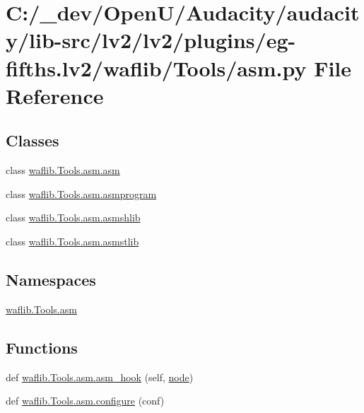 \hypertarget{lv2_2plugins_2eg-fifths_8lv2_2waflib_2_tools_2asm_8py}{}\section{C\+:/\+\_\+dev/\+Open\+U/\+Audacity/audacity/lib-\/src/lv2/lv2/plugins/eg-\/fifths.lv2/waflib/\+Tools/asm.py File Reference}
\label{lv2_2plugins_2eg-fifths_8lv2_2waflib_2_tools_2asm_8py}
\subsection*{Classes}
\begin{DoxyCompactItemize}
\item 
class \hyperlink{classwaflib_1_1_tools_1_1asm_1_1asm}{waflib.\+Tools.\+asm.\+asm}
\item 
class \hyperlink{classwaflib_1_1_tools_1_1asm_1_1asmprogram}{waflib.\+Tools.\+asm.\+asmprogram}
\item 
class \hyperlink{classwaflib_1_1_tools_1_1asm_1_1asmshlib}{waflib.\+Tools.\+asm.\+asmshlib}
\item 
class \hyperlink{classwaflib_1_1_tools_1_1asm_1_1asmstlib}{waflib.\+Tools.\+asm.\+asmstlib}
\end{DoxyCompactItemize}
\subsection*{Namespaces}
\begin{DoxyCompactItemize}
\item 
 \hyperlink{namespacewaflib_1_1_tools_1_1asm}{waflib.\+Tools.\+asm}
\end{DoxyCompactItemize}
\subsection*{Functions}
\begin{DoxyCompactItemize}
\item 
def \hyperlink{namespacewaflib_1_1_tools_1_1asm_a287387dfaa8ffc9c35127be5128a185a}{waflib.\+Tools.\+asm.\+asm\+\_\+hook} (self, \hyperlink{structnode}{node})
\item 
def \hyperlink{namespacewaflib_1_1_tools_1_1asm_a223dd8eb9aca9f00c6758ed10833701a}{waflib.\+Tools.\+asm.\+configure} (conf)
\end{DoxyCompactItemize}
